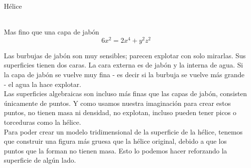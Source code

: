 \documentclass[es]{../../common/SurferDesc}%
\begin{document}
\footnotesize


\begin{surferPage}
  \begin{surferTitle}Hélice\end{surferTitle}   \\
Mas fino que una capa de jabón\\
  \smallskip
\[6x^2	= 2x^4	+ y^2	z^2\]

\singlespacing
Las burbujas de jabón son muy sensibles; parecen explotar con solo mirarlas. Sus superficies tienen dos caras. La cara externa es de jabón y la interna de agua. Si la capa de jabón se vuelve muy fina - es decir si la burbuja se vuelve más grande - el agua la hace explotar.\\
\vspace{0,3cm}
Las superficies algebraicas son incluso más finas que las capas de jabón, consisten únicamente de puntos. Y como usamos nuestra imaginación para crear estos puntos, no tienen masa ni densidad, no explotan, incluso pueden tener picos o torceduras como la hélice.\\
\vspace{0,3cm}
Para poder crear un modelo tridimensional de la superficie de la hélice, tenemos que construir una figura más gruesa que la hélice original, debido a que los puntos que la forman no tienen masa. Esto lo podemos hacer reforzando la superficie de algún lado.

  \begin{surferText}
     \end{surferText}
\end{surferPage}



 
\end{document}
